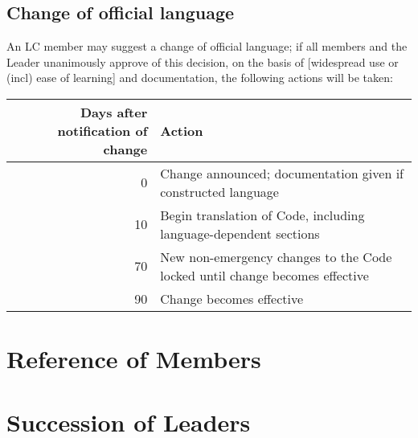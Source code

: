 \documentclass[10pt]{book}
\begin{document}
\section{Change of official language}

An LC member may suggest a change of official language; if all members and the Leader unanimously approve of this decision, on the basis of [widespread use or (incl) ease of learning] and documentation, the following actions will be taken:

\begin{tabular}{|r|p{5cm}|}
 \hline
 Days after notification of change & Action \\ \hline
 0 & Change announced; documentation given if constructed language \\
 10 & Begin translation of Code, including language-dependent sections \\
 70 & New non-emergency changes to the Code locked until change becomes effective \\
 90 & Change becomes effective \\
 \hline
\end{tabular}

\appendix

\chapter{Reference of Members}



\chapter{Succession of Leaders}


\end{document}
